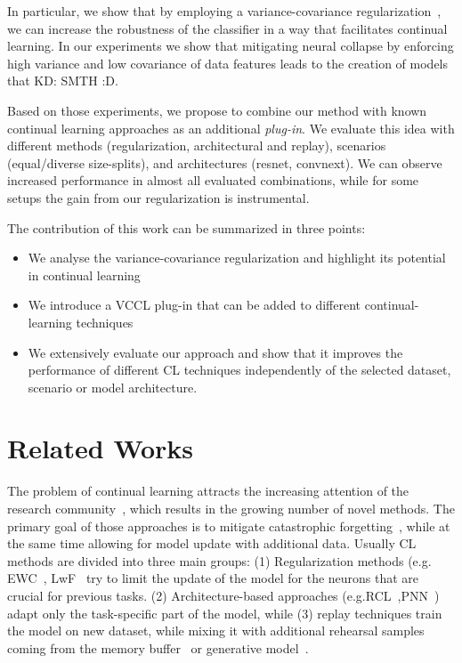 \documentclass{article}
\newcommand\kd[1]{{\color{magenta}  KD: #1}}
\begin{document}
In particular, we show that by employing a variance-covariance regularization~\cite{zhu2023variancecovariance}, we can increase the robustness of the classifier in a way that facilitates continual learning. In our experiments we show that mitigating neural collapse by enforcing high variance and low covariance of data features leads to the creation of models that \kd{SMTH :D}. 

Based on those experiments, we propose to combine our method with known continual learning approaches as an additional \emph{plug-in}. We evaluate this idea with different methods (regularization, architectural and replay), scenarios (equal/diverse size-splits), and architectures (resnet, convnext). We can observe increased performance in almost all evaluated combinations, while for some setups the gain from our regularization is instrumental.

The contribution of this work can be summarized in three points:
\begin{itemize}
    \item We analyse the variance-covariance regularization and highlight its potential in continual learning
    \item We introduce a VCCL plug-in that can be added to different continual-learning techniques
    \item We extensively evaluate our approach and show that it improves the performance of different CL techniques independently of the selected dataset, scenario or model architecture.
\end{itemize}

\section{Related Works}
The problem of continual learning attracts the increasing attention of the research community~\cite{parisi2019continual,mundt2023wholistic}, which results in the growing number of novel methods. The primary goal of those approaches is to mitigate catastrophic forgetting~\cite{1999french}, while at the same time allowing for model update with additional data. Usually CL methods are divided into three main groups: (1) Regularization methods (e.g. EWC~\cite{kirkpatrick2017overcoming}, LwF~\cite{li2017learning} try to limit the update of the model for the neurons that are crucial for previous tasks. (2)  Architecture-based approaches (e.g.RCL~\cite{2018xu+1},PNN~\cite{2016rusu+7}) adapt only the task-specific part of the model, while (3) replay techniques train the model on new dataset, while mixing it with additional rehearsal samples coming from the memory buffer~\cite{2019rolnick+4,aljundi2019online} or generative model~\cite{2017shin+3}.
\end{document}
